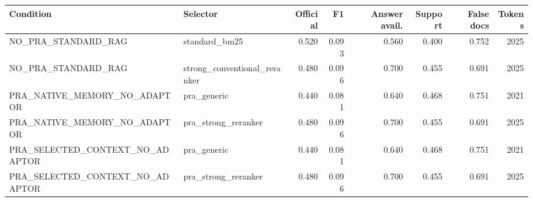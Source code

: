 \begin{tabular}{llrrrrrr}
\toprule
Condition & Selector & Official & F1 & Answer avail. & Support & False docs & Tokens \\
\midrule
NO\_PRA\_STANDARD\_RAG & standard\_bm25 & 0.520 & 0.093 & 0.560 & 0.400 & 0.752 & 2025 \\
NO\_PRA\_STANDARD\_RAG & strong\_conventional\_reranker & 0.480 & 0.096 & 0.700 & 0.455 & 0.691 & 2025 \\
PRA\_NATIVE\_MEMORY\_NO\_ADAPTOR & pra\_generic & 0.440 & 0.081 & 0.640 & 0.468 & 0.751 & 2021 \\
PRA\_NATIVE\_MEMORY\_NO\_ADAPTOR & pra\_strong\_reranker & 0.480 & 0.096 & 0.700 & 0.455 & 0.691 & 2025 \\
PRA\_SELECTED\_CONTEXT\_NO\_ADAPTOR & pra\_generic & 0.440 & 0.081 & 0.640 & 0.468 & 0.751 & 2021 \\
PRA\_SELECTED\_CONTEXT\_NO\_ADAPTOR & pra\_strong\_reranker & 0.480 & 0.096 & 0.700 & 0.455 & 0.691 & 2025 \\
\bottomrule
\end{tabular}
